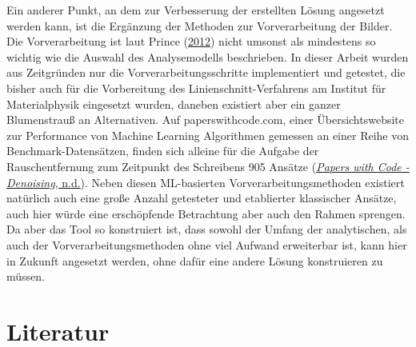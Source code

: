 \documentclass[
  12pt,
  openany]{book}
\begin{document}
Ein anderer Punkt, an dem zur Verbesserung der erstellten Lösung angesetzt werden kann, ist die Ergänzung der Methoden zur Vorverarbeitung der Bilder. Die Vorverarbeitung ist laut Prince (\protect\hyperlink{ref-princePartIVPreprocessing2012}{2012}) nicht umsonst als mindestens so wichtig wie die Auswahl des Analysemodells beschrieben. In dieser Arbeit wurden aus Zeitgründen nur die Vorverarbeitungsschritte implementiert und getestet, die bisher auch für die Vorbereitung des Linienschnitt-Verfahrens am Institut für Materialphysik eingesetzt wurden, daneben existiert aber ein ganzer Blumenstrauß an Alternativen. Auf paperswithcode.com, einer Übersichtswebsite zur Performance von Machine Learning Algorithmen gemessen an einer Reihe von Benchmark-Datensätzen, finden sich alleine für die Aufgabe der Rauschentfernung zum Zeitpunkt des Schreibens 905 Ansätze (\protect\hyperlink{ref-PapersCodeDenoising}{\emph{Papers with {Code} - {Denoising}}, n.d.}). Neben diesen ML-basierten Vorverarbeitungsmethoden existiert natürlich auch eine große Anzahl getesteter und etablierter klassischer Ansätze, auch hier würde eine erschöpfende Betrachtung aber auch den Rahmen sprengen.
Da aber das Tool so konstruiert ist, dass sowohl der Umfang der analytischen, als auch der Vorverarbeitungsmethoden ohne viel Aufwand erweiterbar ist, kann hier in Zukunft angesetzt werden, ohne dafür eine andere Lösung konstruieren zu müssen.

\hypertarget{literatur}{%
\chapter{Literatur}\label{literatur}}
\end{document}
